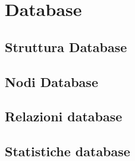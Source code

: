 \documentclass[
10pt, %
a4paper, %
oneside, %
headinclude,footinclude, %
BCOR5mm, %
]{scrartcl}
\begin{document}
\section{Database}
\subsection{Struttura Database}
\subsection{Nodi Database}
\subsection{Relazioni database}
\subsection{Statistiche database}




\renewcommand{\refname}{\spacedlowsmallcaps{References}} %




\end{document}
